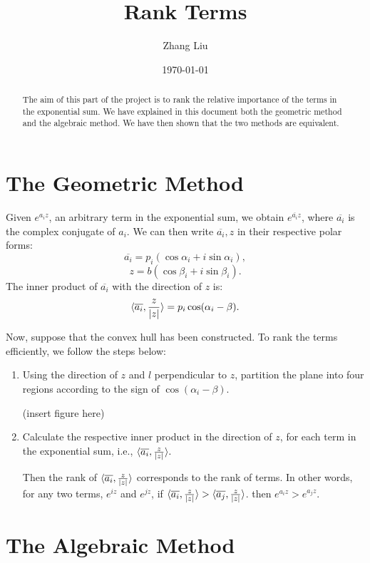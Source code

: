 \documentclass[11pt,reqno,oneside,a4paper]{article}
\author{Zhang Liu}
\title{Rank Terms}
\date{\today}
\begin{document}
\maketitle
\thispagestyle{fancy}

\begin{abstract}
	The aim of this part of the project is to rank the relative importance of the terms in the exponential sum. We have explained in this document both the geometric method and the algebraic method. We have then shown that the two methods are equivalent.  
\end{abstract}


\section{The Geometric Method} \label{sec:geom}
	Given $e^{a_i z}$, an arbitrary term in the exponential sum, we obtain $e^{\overline{a_i}z}$, where $\overline{a_i}$ is the complex conjugate of $a_i$. We can then write $\overline{a_i},z$ in their respective polar forms:
	$$\overline{a_i} = p_i (\cos\alpha_i + i\sin\alpha_i),$$
	$$z = b (\cos\beta_i + i\sin\beta_i).$$ 
	The inner product of $\overline{a_i}$ with the direction of $z$ is:
	$$
	\langle \overline{a_i}, \frac{z}{\left\lvert z\right\rvert} \rangle = p_i \cos(\alpha_i - \beta).
	$$
	
	Now, suppose that the convex hull has been constructed. To rank the terms efficiently, we follow the steps below:
	\begin{enumerate}
		\item Using the direction of $z$ and $l$ perpendicular to $z$, partition the plane into four regions according to the sign of $\cos(\alpha_i - \beta).$
		
	(insert figure here)
		
		\item Calculate the respective inner product in the direction of $z$, for each term in the exponential sum, i.e., $	\langle \overline{a_i}, \frac{z}{\left\lvert z\right\rvert} \rangle.$
		
		Then the rank of $	\langle \overline{a_i}, \frac{z}{\left\lvert z\right\rvert} \rangle$ corresponds to the rank of terms. In other words, for any two terms, $e^{iz}$ and $e^{jz}$, if $	\langle \overline{a_i}, \frac{z}{\left\lvert z\right\rvert} \rangle > 	\langle \overline{a_j}, \frac{z}{\left\lvert z\right\rvert} \rangle$. then $e^{a_iz}>e^{a_jz}.$
		  
	\end{enumerate}
\section{The Algebraic Method}\label{sec:alg} 
\end{document}
